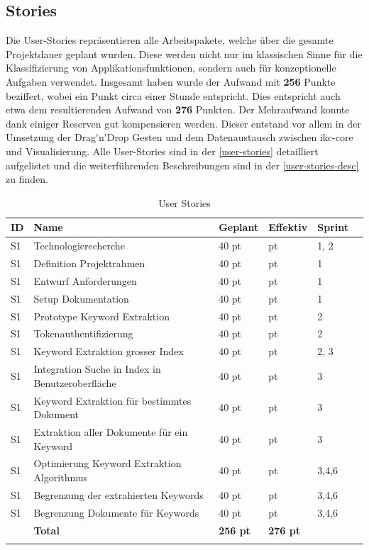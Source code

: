 \subsection{Stories}
Die User-Stories repräsentieren alle Arbeitspakete, welche über die gesamte Projektdauer geplant wurden. Diese werden nicht nur im klassischen Sinne für die Klassifizierung von Applikationsfunktionen, sondern auch für konzeptionelle Aufgaben verwendet. Insgesamt haben wurde der Aufwand mit \textbf{256} Punkte beziffert, wobei ein Punkt circa einer Stunde entspricht. Dies entspricht auch etwa dem resultierenden Aufwand von \textbf{276} Punkten. Der Mehraufwand konnte dank einiger Reserven gut kompensieren werden. Dieser entstand vor allem in der Umsetzung der \gls{Drag'n'Drop} Gesten und dem Datenaustausch zwischen \gls{ikc-core} und Visualisierung. Alle User-Stories sind in der \autoref{user-stories} detailliert aufgelistet und die weiterführenden Beschreibungen sind in der \autoref{user-stories-desc} zu finden.
\begin{longtable}{|p{0.6cm}|P{3.5cm}|p{1.4cm}|p{1.4cm}|p{2.4cm}|p{1.1cm}|}
\hline
ID  & Name & Geplant & Effektiv &Sprint\\ \hline
S1 & Technologierecherche           & 40 pt             &  pt              & 1, 2 \\ \hline
S1 & Definition Projektrahmen           & 40 pt             &  pt              & 1  \\ \hline
S1 & Entwurf Anforderungen           & 40 pt             &  pt              & 1 \\ \hline
S1 & Setup Dokumentation           & 40 pt             &  pt              & 1 \\ \hline
S1 & Prototype Keyword Extraktion            & 40 pt             &  pt              & 2 \\ \hline
S1 & Tokenauthentifizierung           & 40 pt             &  pt              & 2 \\ \hline
S1 & Keyword Extraktion grosser Index          & 40 pt             &  pt              & 2, 3 \\ \hline
S1 & Integration Suche in Index in Benutzeroberfläche           & 40 pt             &  pt              & 3 \\ \hline
S1 & Keyword Extraktion für bestimmtes Dokument         & 40 pt             &  pt              & 3 \\ \hline
S1 & Extraktion aller Dokumente für ein Keyword       & 40 pt             &  pt              & 3 \\ \hline
S1 & Optimierung Keyword Extraktion Algorithmus    & 40 pt             &  pt              & 3,4,6 \\ \hline
S1 & Begrenzung der extrahierten Keywords    & 40 pt             &  pt              & 3,4,6 \\ \hline
S1 & Begrenzung Dokumente für Keywords    & 40 pt             &  pt              & 3,4,6 \\ \hline
\hline
 & \textbf{Total}                       & \textbf{256 pt}             & \textbf{276 pt}               &  &  \\ \hline
    \caption{User Stories}
 \label{user-stories}
\end{longtable}

